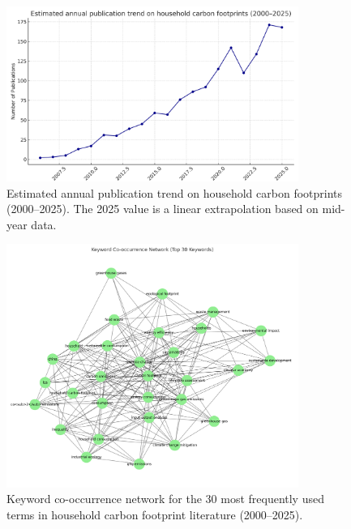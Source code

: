 \documentclass[12pt,a4paper]{article}%
\begin{document}
\begin{figure}[htbp]
    \centering
    \includegraphics[width=0.85\textwidth]{publication_trend_darkblue_estimated2025.png}
    \caption{\small{Estimated annual publication trend on household carbon footprints (2000–2025). The 2025 value is a linear extrapolation based on mid-year data.}}
\end{figure}

\begin{figure}[htbp]
    \centering
    \includegraphics[width=0.85\textwidth]{keyword_cooccurrence.png}
    \caption{\small{Keyword co-occurrence network for the 30 most frequently used terms in household carbon footprint literature (2000–2025).}}
\end{figure}
\end{document}
